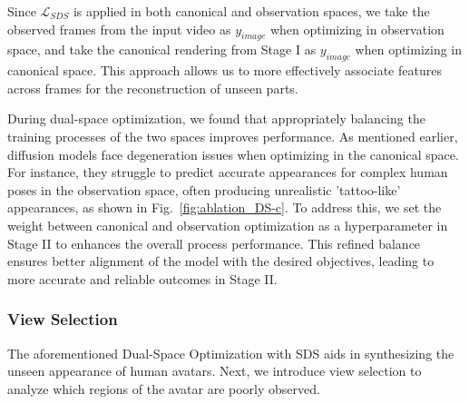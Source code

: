 Since $\mathcal{L}_{SDS}$ is applied in both canonical and observation spaces, we take the observed frames from the input video as $y_{image}$ when optimizing in observation space, and take the canonical rendering from Stage I as $y_{image}$ when optimizing in canonical space.
This approach allows us to more effectively associate features across frames for the reconstruction of unseen parts.
 



During dual-space optimization, we found that appropriately balancing the training processes of the two spaces improves performance. As mentioned earlier, diffusion models face degeneration issues when optimizing in the canonical space. %
For instance, they struggle to predict accurate appearances for complex human poses in the observation space, often producing unrealistic 'tattoo-like' appearances, as shown in Fig.~\ref{fig:ablation_DS-c}. To address this, we set the weight between canonical and observation optimization as a hyperparameter in Stage II to enhances the overall process performance. This refined balance ensures better alignment of the model with the desired objectives, leading to more accurate and reliable outcomes in Stage II.




\subsubsection{View Selection}
\label{viewSelection}


The aforementioned Dual-Space  Optimization with SDS aids in synthesizing the unseen appearance of human avatars. Next, we introduce view selection to analyze which regions of the avatar are poorly observed.

